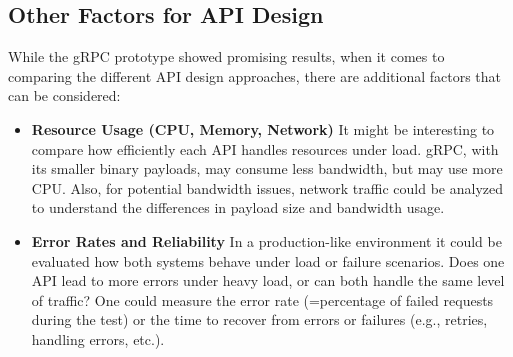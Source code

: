 \subsection{Other Factors for API Design}

While the gRPC prototype showed promising results, when it comes to comparing the different \ac{API} design approaches, there are additional factors that can be considered:

\begin{itemize}
    \item \textbf{Resource Usage (CPU, Memory, Network)}
    It might be interesting to compare how efficiently each \ac{API} handles resources under load. gRPC, with its smaller binary payloads, may consume less bandwidth, but may use more CPU. 
    Also, for potential bandwidth issues, network traffic could be analyzed to understand the differences in payload size and bandwidth usage.
    
    \item \textbf{Error Rates and Reliability}
    In a production-like environment it could be evaluated how both systems behave under load or failure scenarios. Does one \ac{API} lead to more errors under heavy load, or can both handle the same level of traffic? One could measure the error rate (=percentage of failed requests during the test) or the time to recover from errors or failures (e.g., retries, handling errors, etc.).
\end{itemize}
